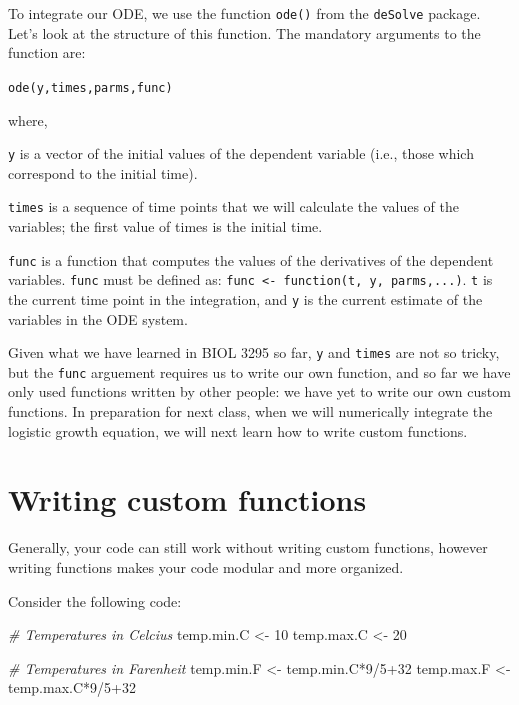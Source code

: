 \documentclass[]{book}
\newenvironment{Shaded}{\begin{snugshade}}{\end{snugshade}}
\newcommand{\DecValTok}[1]{\textcolor[rgb]{0.00,0.00,0.81}{{#1}}}
\newcommand{\StringTok}[1]{\textcolor[rgb]{0.31,0.60,0.02}{{#1}}}
\newcommand{\CommentTok}[1]{\textcolor[rgb]{0.56,0.35,0.01}{\textit{{#1}}}}
\newcommand{\NormalTok}[1]{{#1}}
\begin{document}
To integrate our ODE, we use the function \texttt{ode()} from the
\texttt{deSolve} package. Let's look at the structure of this function.
The mandatory arguments to the function are:

\texttt{ode(y,times,parms,func)}

where,

\texttt{y} is a vector of the initial values of the dependent variable
(i.e., those which correspond to the initial time).

\texttt{times} is a sequence of time points that we will calculate the
values of the variables; the first value of times is the initial time.

\texttt{func} is a function that computes the values of the derivatives
of the dependent variables. \texttt{func} must be defined as:
\texttt{func\ \textless{}-\ function(t,\ y,\ parms,...)}. \texttt{t} is
the current time point in the integration, and \texttt{y} is the current
estimate of the variables in the ODE system.

Given what we have learned in BIOL 3295 so far, \texttt{y} and
\texttt{times} are not so tricky, but the \texttt{func} arguement
requires us to write our own function, and so far we have only used
functions written by other people: we have yet to write our own custom
functions. In preparation for next class, when we will numerically
integrate the logistic growth equation, we will next learn how to write
custom functions.

\section{Writing custom functions}\label{writing-custom-functions}

Generally, your code can still work without writing custom functions,
however writing functions makes your code modular and more organized.

Consider the following code:

\begin{Shaded}
\begin{Highlighting}[]
\CommentTok{# Temperatures in Celcius}
\NormalTok{temp.min.C <-}\StringTok{ }\DecValTok{10}
\NormalTok{temp.max.C <-}\StringTok{ }\DecValTok{20}

\CommentTok{# Temperatures in Farenheit}
\NormalTok{temp.min.F <-}\StringTok{ }\NormalTok{temp.min.C*}\DecValTok{9}\NormalTok{/}\DecValTok{5+32}
\NormalTok{temp.max.F <-}\StringTok{ }\NormalTok{temp.max.C*}\DecValTok{9}\NormalTok{/}\DecValTok{5+32} 
\end{Highlighting}
\end{Shaded}
\end{document}
